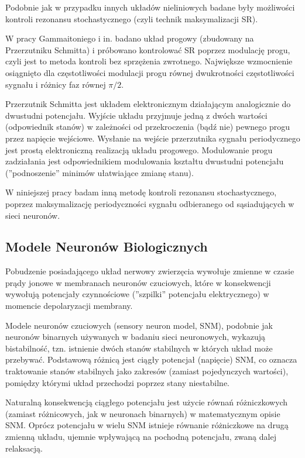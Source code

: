   Podobnie jak w przypadku innych układów nieliniowych badane były możliwości kontroli rezonansu stochastycznego (czyli technik maksymalizacji SR). 

  W pracy Gammaitoniego i in. \cite{gammaitoni} badano układ progowy (zbudowany na Przerzutniku Schmitta) i próbowano kontrolować SR poprzez modulację progu, czyli jest to metoda kontroli bez sprzężenia zwrotnego. Największe wzmocnienie osiągnięto dla częstotliwości modulacji progu równej dwukrotności częstotliwości sygnału i różnicy faz równej $\pi/2$.

  Przerzutnik Schmitta jest układem elektronicznym działającym analogicznie do dwustudni potencjału. Wyjście układu przyjmuje jedną z dwóch wartości (odpowiednik stanów) w zależności od przekroczenia (bądź nie) pewnego progu przez napięcie wejściowe. Wysłanie na wejście przerzutnika sygnału periodycznego jest prostą elektroniczną realizacją układu progowego. Modulowanie progu zadziałania jest odpowiednikiem modulowania kształtu dwustudni potencjału (''podnoszenie'' minimów ułatwiające zmianę stanu).

  W niniejszej pracy badam inną metodę kontroli rezonansu stochastycznego, poprzez maksymalizację periodyczności sygnału odbieranego od sąsiadujących w sieci neuronów.

  
  \subsection{Modele Neuronów Biologicznych}
  
  Pobudzenie posiadającego układ nerwowy zwierzęcia wywołuje zmienne w czasie prądy jonowe w membranach neuronów czuciowych, które w konsekwencji wywołują potencjały czynnościowe (''szpilki'' potencjału elektrycznego) w momencie depolaryzacji membrany.
  
  Modele neuronów czuciowych (sensory neuron model, SNM), podobnie jak neuronów binarnych używanych w badaniu sieci neuronowych, wykazują bistabilność, tzn. istnienie dwóch stanów stabilnych w których układ może przebywać. Podstawową różnicą jest ciągły potencjał (napięcie) SNM, co oznacza traktowanie stanów stabilnych jako zakresów (zamiast pojedynczych wartości), pomiędzy którymi układ przechodzi poprzez stany niestabilne. 
  
  Naturalną konsekwencją ciągłego potencjału jest użycie równań różniczkowych (zamiast różnicowych, jak w neuronach binarnych) w matematycznym opisie SNM. Oprócz potencjału w wielu SNM istnieje równanie różniczkowe na drugą zmienną układu, ujemnie wpływającą na pochodną potencjału, zwaną dalej relaksacją.
  
